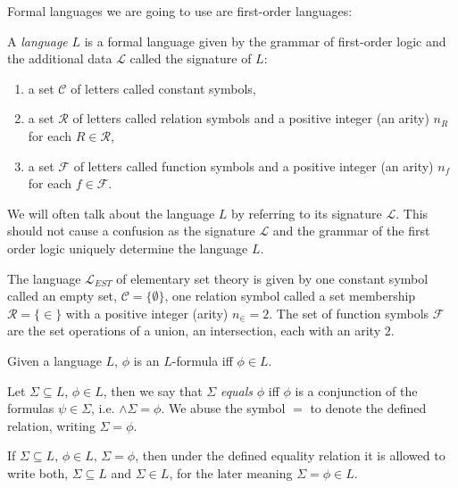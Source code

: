Formal languages we are going to use are first-order languages:
\begin{defn}
A \emph{language} $L$ is a formal language given by the grammar of first-order logic and the additional data $\mathcal{L}$ called the signature of $L$:
\begin{enumerate}
\item a set $\mathcal{C}$ of letters called constant symbols,
\item a set $\mathcal{R}$ of letters called relation symbols and a positive integer (an arity) $n_R$ for each $R \in \mathcal{R}$,
\item a set $\mathcal{F}$ of letters called function symbols and a positive integer (an arity) $n_f$ for each $f \in \mathcal{F}$.
\end{enumerate}
\end{defn}

\begin{remark}
We will often talk about the language $L$ by referring to its signature $\mathcal{L}$. This should not cause a confusion as the signature $\mathcal{L}$ and the grammar of the first order logic uniquely determine the language $L$.
\end{remark}

\begin{exmp}
The language $\mathcal{L}_{EST}$ of elementary set theory is given by one constant symbol called an empty set, $\mathcal{C}=\{\emptyset\}$, one relation symbol called a set membership $\mathcal{R}=\{\in\}$ with a positive integer (arity) $n_{\in}=2$. The set of function symbols $\mathcal{F}$ are the set operations of a union, an intersection, each with an arity $2$.
\end{exmp}

\begin{defn}
Given a language $L$, $\phi$ is an $L$-formula iff $\phi \in L$.
\end{defn}

\begin{defn}
Let $\Sigma \subseteq L$, $\phi \in L$, then we say that $\Sigma$ \emph{equals} $\phi$ iff $\phi$ is a conjunction of the formulas $\psi \in \Sigma$, i.e. $\land \Sigma = \phi$. We abuse the symbol $=$ to denote the defined relation, writing $\Sigma=\phi$.
\end{defn}

\begin{remark}
If $\Sigma \subseteq L$, $\phi \in L$, $\Sigma=\phi$, then under the defined equality relation it is allowed to write both, $\Sigma \subseteq L$ and $\Sigma \in L$, for the later meaning $\Sigma = \phi \in L$.
\end{remark}

